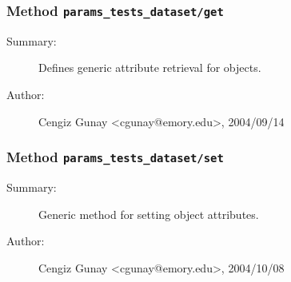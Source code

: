 \subsubsection[Method \texttt{get}]{Method \texttt{params\_tests\_dataset/get}}%
%
\label{ref_params_tests_dataset__get}%
\hypertarget{ref_params_tests_dataset__get}{}%
\begin{description}
\item[Summary:]Defines generic attribute retrieval for objects.
%
%
%
%
%
%
%
\item[Author:]%
Cengiz Gunay <cgunay@emory.edu>, 2004/09/14%
\end{description}
\methodline%
\subsubsection[Method \texttt{set}]{Method \texttt{params\_tests\_dataset/set}}%
%
\label{ref_params_tests_dataset__set}%
\hypertarget{ref_params_tests_dataset__set}{}%
\begin{description}
\item[Summary:]Generic method for setting object attributes.
%
%
%
%
%
%
%
\item[Author:]%
Cengiz Gunay <cgunay@emory.edu>, 2004/10/08%
\end{description}
\methodline%
